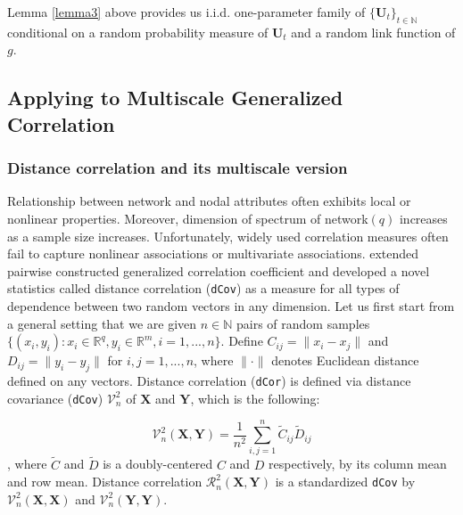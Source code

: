 \documentclass[12pt]{article}
\theoremstyle{definition}
\begin{document}
	
	Lemma \ref{lemma3} above provides us i.i.d. one-parameter family of $\{ \mathbf{U}_{t} \}_{t \in \mathbb{N}}$ conditional on a random probability measure of $\mathbf{U}_{t}$ and a random link function of $g$.
	
	
\newpage
\subsection{Applying to Multiscale Generalized Correlation}
	
\subsubsection{Distance correlation and its multiscale version}
	
Relationship between network and nodal attributes often exhibits local or nonlinear properties. Moreover, dimension of spectrum of network$(q)$ increases as a sample size increases. Unfortunately, widely used correlation measures often fail to capture nonlinear associations or multivariate associations. \cite{szekely2007measuring} extended pairwise constructed generalized correlation coefficient and developed a novel statistics called distance correlation (\texttt{dCov}) as a measure for all types of dependence between two random vectors in any dimension. Let us first start from a general setting that we are given $n \in \mathbb{N}$ pairs of random samples $\{ (x_{i}, y_{i}) : x_{i} \in \mathbb{R}^{q}, y_{i} \in \mathbb{R}^{m}, i = 1,...,n \}$. Define $C_{ij} = \parallel x_{i} - x_{j} \parallel$ and $D_{ij} = \parallel y_{i} - y_{j} \parallel$ for $i,j=1,...,n$, where $\parallel \cdot \parallel$ denotes Euclidean distance defined on any vectors.   
Distance correlation (\texttt{dCor}) is defined via distance covariance (\texttt{dCov}) $\mathcal{V}^2_{n}$ of $\boldsymbol{X}$ and $\boldsymbol{Y}$, which is the following: 
	
\begin{equation}	 
\mathcal{V}^2_{n}(\boldsymbol{X}, \boldsymbol{Y}) = \frac{1}{n^2} \sum\limits_{i,j=1}^{n} \tilde{C}_{ij} \tilde{D}_{ij}
\end{equation}
, where $\tilde{C}$ and $\tilde{D}$ is a doubly-centered $C$ and $D$ respectively, by its column mean and row mean. Distance correlation $\mathcal{R}^{2}_{n}(\boldsymbol{X}, \boldsymbol{Y})$ is a standardized \texttt{dCov} by $\mathcal{V}^2_{n}(\boldsymbol{X}, \boldsymbol{X})$ and $\mathcal{V}^2_{n}(\boldsymbol{Y}, \boldsymbol{Y}).$
	
\end{document}
